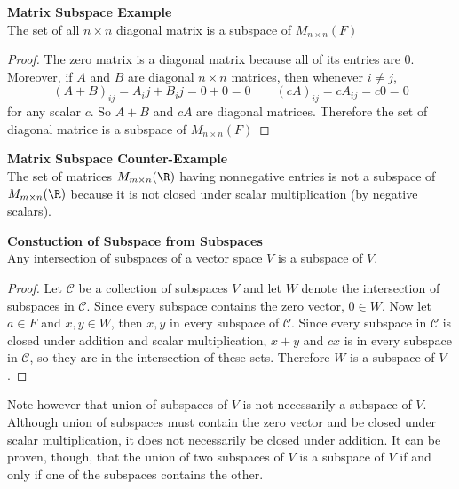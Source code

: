 \documentclass[11pt]{article}
\begin{document}
\begin{defn*}
    \textbf{Matrix Subspace Example} \\
    The set of all $n\times n$ diagonal matrix is a subspace of $M_{n\times n}(F)$ 
    \begin{proof}
        The zero matrix is a diagonal matrix because all of its entries are 0. Moreover, if $A$ and $B$ are diagonal $n\times n$ matrices, then whenever $i\neq j$, 
        \[
            (A+B)_{ij} = A_ij + B_ij = 0 + 0 = 0 
            \quad  \quad 
            (cA)_{ij} = cA_{ij} = c0 = 0    
        \]
        for any scalar $c$. So $A+B$ and $cA$ are diagonal matrices. Therefore the set of diagonal matrice is a subspace of $M_{n\times n}(F)$ 
    \end{proof}
\end{defn*}

\begin{defn*}
    \textbf{Matrix Subspace Counter-Example} \\ 
    The set of matrices $M_{m\times n}(\R)$ having nonnegative entries is not a subspace of $M_{m\times n}(\R)$ because it is not closed under scalar multiplication (by negative scalars). 
\end{defn*}

\begin{theorem*}
    \textbf{Constuction of Subspace from Subspaces} \\
    Any intersection of subspaces of a vector space $V$ is a subspace of $V$. 
    \begin{proof}
        Let $\mathcal{C}$ be a collection of subspaces $V$ and let $W$ denote the intersection of subspaces in $\mathcal{C}$. Since every subspace contains the zero vector, $0\in W$. Now let $a\in F$ and $x,y \in W$, then $x,y$ in every subspace of $\mathcal{C}$. Since every subspace in $\mathcal{C}$ is closed under addition and scalar multiplication, $x+y$ and $cx$ is in every subspace in $\mathcal{C}$, so they are in the intersection of these sets. Therefore $W$ is a subspace of $V$. 
    \end{proof}
    \begin{rem}
        Note however that union of subspaces of $V$ is not necessarily a subspace of $V$. Although union of subspaces must contain the zero vector and be closed under scalar multiplication, it does not necessarily be closed under addition. It can be proven, though, that the union of two subspaces of $V$ is a subspace of $V$ if and only if one of the subspaces contains the other. 
    \end{rem}
\end{theorem*}
\end{document}
